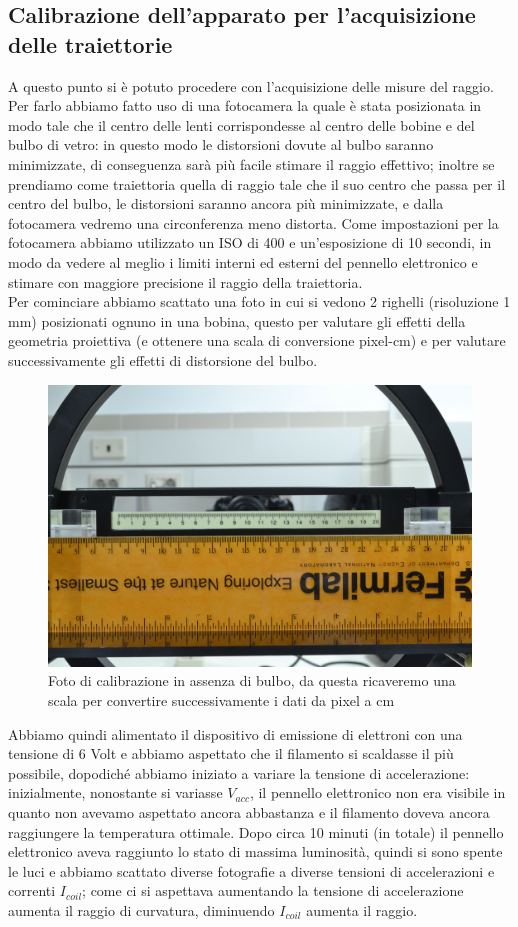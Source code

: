 \documentclass[10pt, a4paper, italian]{article}
\begin{document}
\subsection{Calibrazione dell'apparato per l'acquisizione delle traiettorie}
\label{sec: conv}
A questo punto si è potuto procedere con l'acquisizione delle misure del raggio.
Per farlo abbiamo fatto uso di una fotocamera la quale è stata posizionata in modo tale che il centro delle lenti corrispondesse al centro delle bobine e del bulbo di vetro: in questo modo le distorsioni dovute al bulbo saranno minimizzate, di conseguenza sarà più facile stimare il raggio effettivo; inoltre se prendiamo come traiettoria quella di raggio tale che il suo centro che passa per il centro del bulbo, le distorsioni saranno ancora più minimizzate, e dalla fotocamera vedremo una circonferenza meno distorta.
Come impostazioni per la fotocamera abbiamo utilizzato un ISO di 400 e un'esposizione di 10 secondi, in modo da vedere al meglio i limiti interni ed esterni del pennello elettronico e stimare con maggiore precisione il raggio della traiettoria.\\
Per cominciare abbiamo scattato una foto in cui si vedono 2 righelli (risoluzione 1 mm) posizionati ognuno in una bobina, questo per valutare gli effetti della geometria proiettiva (e ottenere una scala di conversione pixel-cm) e per valutare successivamente gli effetti di distorsione del bulbo.
\begin{figure}
\includegraphics[scale=0.4]{cal1}
\caption{Foto di calibrazione in assenza di bulbo, da questa ricaveremo una scala per convertire successivamente i dati da pixel a cm}
\end{figure}
Abbiamo quindi alimentato il dispositivo di emissione di elettroni con una tensione di 6 Volt e abbiamo aspettato che il filamento si scaldasse il più possibile, dopodiché abbiamo iniziato a variare la tensione di accelerazione: inizialmente, nonostante si variasse $V_{acc}$, il pennello elettronico non era visibile in quanto non avevamo aspettato ancora abbastanza e il filamento doveva ancora raggiungere la temperatura ottimale. Dopo circa 10 minuti (in totale) il pennello elettronico aveva raggiunto lo stato di massima luminosità, quindi si sono spente le luci e abbiamo scattato diverse fotografie a diverse tensioni di accelerazioni e correnti $I_{coil}$; come ci si aspettava aumentando la tensione di accelerazione aumenta il raggio di curvatura, diminuendo $I_{coil}$ aumenta il raggio.
\end{document}
